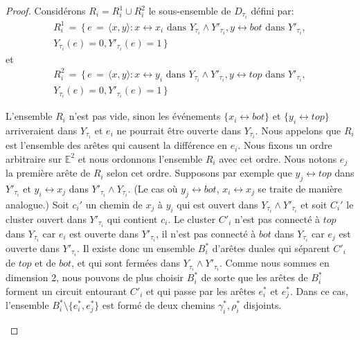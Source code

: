 \documentclass[titlepage,a4paper,12pt]{article}
\begin{document}
\begin{proof}
Considérons $R_i = R_i^1\cup R_i^2$ le sous-ensemble de $D_{\tau_i}$ défini par:
\begin{multline*}R_i^1 \,=\, \big\{ \,e \,=\, \langle x,y\rangle: x\longleftrightarrow x_i \text{ dans } Y_{\tau_i}\wedge Y'_{\tau_i}
 , y\longleftrightarrow bot\text{ dans }Y'_{\tau_i},\\
Y_{\tau_i}(e) = 0, Y'_{\tau_i}(e) = 1
\,\big\}
\end{multline*}
et 
\begin{multline*}R_i^2 \,=\, \big\{ \,e \,=\, \langle x,y\rangle: x\longleftrightarrow y_i \text{ dans } Y_{\tau_i}\wedge Y'_{\tau_i},
 y\longleftrightarrow top\text{ dans }Y'_{\tau_i},\\
Y_{\tau_i}(e) = 0, Y'_{\tau_i}(e) = 1
\,\big\}
\end{multline*}

L'ensemble $R_i$ n'est pas vide, sinon les événements $\{x_i\longleftrightarrow bot\}$ et $\{y_i\longleftrightarrow top\}$ arriveraient dans $Y_{\tau_i}$ et $e_i$ ne pourrait être ouverte dans $Y_{\tau_i}$. Nous appelons que $R_i$ est l'ensemble des arêtes qui causent la différence en $e_i$. Nous fixons un ordre arbitraire sur $\mathbb{E}^2$ et nous ordonnons l'ensemble $R_i$ avec cet ordre. Nous notons $e_j$ la première arête de $R_i$ selon cet ordre. Supposons par exemple que $y_j \longleftrightarrow top$ dans $Y'_{\tau_i}$ et $y_i\longleftrightarrow x_j$ dans $Y'_{\tau_i}\wedge Y_{\tau_i}$. (Le cas où $y_j\longleftrightarrow bot$, $x_i\longleftrightarrow x_j$ se traite de manière analogue.)
Soit $c_i'$ un chemin de $x_j$ à $y_i$ qui est ouvert dans $Y_{\tau_i}\wedge Y'_{\tau_i}$ et soit $C_i'$ le cluster ouvert dans $Y'_{\tau_i}$ qui contient $c_i$. Le cluster $C'_i$ n'est pas connecté à $top$ dans $Y_{\tau_i}$ car $e_i$ est ouverte dans $Y'_{\tau_i}$, il n'est pas connecté à $bot$ dans $Y_{\tau_i}$ car $e_j$ est ouverte dans $Y'_{\tau_i}$. Il existe donc un ensemble $B_i^*$ d'arêtes duales qui séparent $C'_i$ de $top$ et de $bot$, et qui sont fermées dans $Y_{\tau_i}\wedge Y'_{\tau_i}$.
Comme nous sommes en dimension 2, nous pouvons de plus choisir $B_i^*$ de sorte que les arêtes de $B_i^*$ forment un circuit entourant $C'_i$ et qui passe par les arêtes $e_i^*$ et $e_j^*$. Dans ce cas, l'ensemble $B_i^*\setminus \{e_i^*,e_j^*\}$ est formé de deux chemins $\gamma_i^*, \rho_i^*$ disjoints.
\begin{figure}[h]


\end{figure}
\end{proof}
\end{document}
